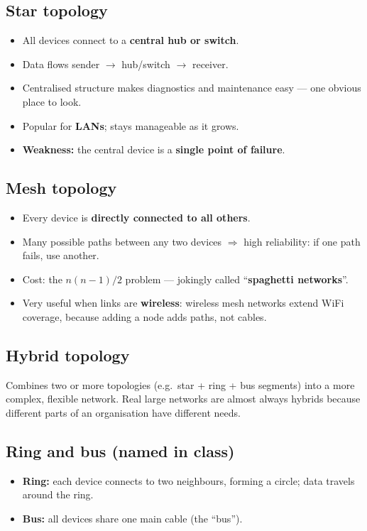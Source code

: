 \subsection{Star topology}
\begin{itemize}
  \item All devices connect to a \textbf{central hub or switch}.
  \item Data flows sender $\to$ hub/switch $\to$ receiver.
  \item Centralised structure makes diagnostics and maintenance easy --- one obvious place to look.
  \item Popular for \textbf{LANs}; stays manageable as it grows.
  \item \textbf{Weakness:} the central device is a \textbf{single point of failure}.
\end{itemize}

\subsection{Mesh topology}
\begin{itemize}
  \item Every device is \textbf{directly connected to all others}.
  \item Many possible paths between any two devices $\Rightarrow$ high reliability: if one path fails, use another.
  \item Cost: the $n(n-1)/2$ problem --- jokingly called ``\textbf{spaghetti networks}''.
  \item Very useful when links are \textbf{wireless}: wireless mesh networks extend WiFi coverage, because adding a node adds paths, not cables.
\end{itemize}

\subsection{Hybrid topology}
Combines two or more topologies (e.g.\ star + ring + bus segments) into a more complex, flexible network. Real large networks are almost always hybrids because different parts of an organisation have different needs.

\subsection{Ring and bus (named in class)}
\begin{itemize}
  \item \textbf{Ring:} each device connects to two neighbours, forming a circle; data travels around the ring.
  \item \textbf{Bus:} all devices share one main cable (the ``bus'').
\end{itemize}

